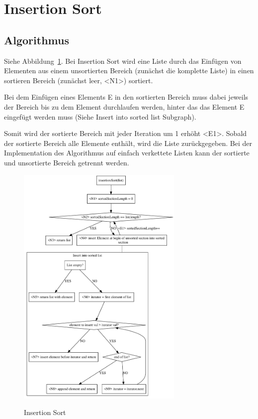\documentclass[11pt]{article}
\begin{document}
    \section{Insertion Sort}\label{sec:insertion-sort}

    \subsection{Algorithmus}\label{subsec:Ialgorithmus}
    Siehe Abbildung~\ref{fig:insertionS}.
    Bei Insertion Sort wird eine Liste durch das Einfügen von Elementen aus
    einem unsortierten Bereich (zunächst die komplette Liste) in einen sortieren
    Bereich (zunächst leer, <N1>) sortiert.

    Bei dem Einfügen eines Elements E in den sortierten Bereich muss dabei
    jeweils der Bereich bis zu dem Element durchlaufen werden, hinter das das
    Element E eingefügt werden muss (Siehe \frqq Insert into sorted list\flqq
    Subgraph).

    Somit wird der sortierte Bereich mit jeder Iteration um 1 erhöht <E1>.
    Sobald der sortierte Bereich alle Elemente enthält, wird die Liste
    zurückgegeben.
    Bei der Implementation des Algorithmus auf einfach verkettete Listen
    kann der sortierte und unsortierte Bereich getrennt werden.


    \begin{figure}[hbt]
        \caption{Insertion Sort}
        \centering
        \includegraphics[width = 8cm]{insertionS}\label{fig:insertionS}
    \end{figure}
    \FloatBarrier
\end{document}
